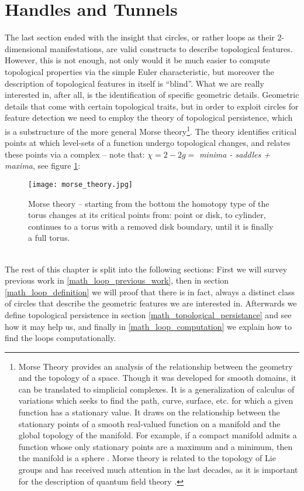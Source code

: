 \newpage
\section{Handles and Tunnels}
\label{math2}

The last section ended with the insight that circles, or rather loops as their 2-dimensional manifestations, are valid constructs to describe topological features.
However, this is not enough, not only would it be much easier to compute topological properties via the simple Euler characteristic, but moreover the description of topological features in itself is ``blind''.
What we are really interested in, after all, is the identification of specific geometric details.
Geometric details that come with certain topological traits, but in order to exploit circles for feature detection we need to employ the theory of topological persistence, which is a substructure of the more general Morse theory\footnote{ Morse Theory provides an analysis of the relationship between the geometry and the topology of a space. Though it was developed for smooth domains, it can be translated to simplicial complexes. It is a generalization of calculus of variations which seeks to find the path, curve, surface, etc. for which a given function has a stationary value. It draws on the relationship between the stationary points of a smooth real-valued function on a manifold and the global topology of the manifold. For example, if a compact manifold admits a function whose only stationary points are a maximum and a minimum, then the manifold is a sphere \citep[for an introduction, see:][]{Kitagawa2006}. Morse theory is related to the topology of Lie groups and has received much attention in the last decades, as it is important for the description of quantum field theory \citep[cf.][]{Witten1982}.}.
The theory identifies critical points at which level-sets of a function undergo topological changes, and relates these points via a complex -- note that: $\chi = 2 - 2g =$ \textit{minima - saddles + maxima}, see figure \ref{fig:morse_theory}:
\begin{figure}[htb]
\centering
\texttt{[image: morse\_theory.jpg]}
\caption{Morse theory -- starting from the bottom the homotopy type of the torus changes at its critical points from: point or disk, to cylinder, continues to a torus with a removed disk boundary, until it is finally a full torus.}
\label{fig:morse_theory}
\end{figure}\\
The rest of this chapter is split into the following sections: First we will survey previous work in \ref{math_loop_previous_work}, then in section \ref{math_loop_definition} we will proof that there is in fact, always a distinct class of circles that describe the geometric features we are interested in.
Afterwards we define topological persistence in section \ref{math_topological_persistance} and see how it may help us, and finally in \ref{math_loop_computation} we explain how to find the loops computationally.

